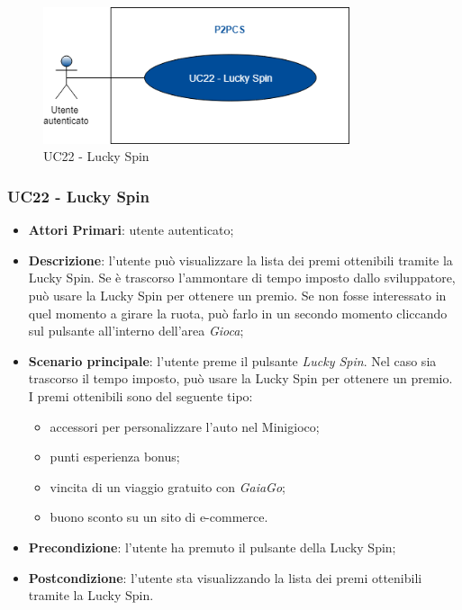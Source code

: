 \begin{figure}[h]
	\includegraphics[width=9cm]{res/images/UC20Luckyspin.png}
	\centering
	\caption{UC22 - Lucky Spin}
\end{figure}
\subsubsection{UC22 - Lucky Spin}
\begin{itemize}
	\item \textbf{Attori Primari}: utente autenticato;
	\item \textbf{Descrizione}:	l'utente può visualizzare la lista dei premi ottenibili tramite la Lucky Spin\glo. Se è trascorso l'ammontare di tempo imposto dallo sviluppatore, può usare la Lucky Spin per ottenere un premio. Se non fosse interessato in quel momento a girare la ruota, può farlo in un secondo momento cliccando sul pulsante all'interno dell'area \textit{Gioca};
	\item \textbf{Scenario principale}: l'utente preme il pulsante \textit{Lucky Spin}. Nel caso sia trascorso il tempo imposto, può usare la Lucky Spin per ottenere un premio. I premi ottenibili sono del seguente tipo:
	\begin{itemize}
		\item accessori per personalizzare l'auto nel Minigioco;
		\item punti esperienza bonus;
		\item vincita di un viaggio gratuito con \textit{GaiaGo};
		\item buono sconto su un sito di e-commerce.	
	\end{itemize}
	\item \textbf{Precondizione}: l'utente ha premuto il pulsante della Lucky Spin;
	\item \textbf{Postcondizione}: l'utente sta visualizzando la lista dei premi ottenibili tramite la Lucky Spin.
\end{itemize}
